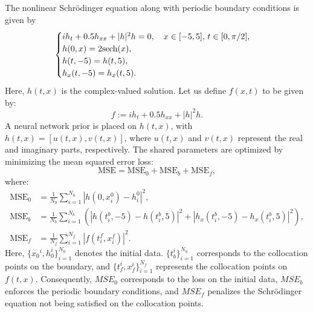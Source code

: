 \begin{example}
    The nonlinear Schrödinger equation along with periodic boundary conditions is given by
\begin{equation}\label{eq:PINN-NLS}
    \begin{cases}
        i h_t + 0.5 h_{xx} + |h|^2 h = 0, \quad x \in [-5, 5], \, t \in [0, \pi/2], \\
        h(0, x) = 2 \text{sech}{(x)}, \\
        h(t, -5) = h(t, 5), \\
        h_x(t, -5) = h_x(t, 5).
    \end{cases}
\end{equation}
Here, $ h(t, x) $ is the complex-valued solution. Let us define $ f(x,t) $ to be given by:
\begin{equation}
    f := i h_t + 0.5 h_{xx} + |h|^2 h.
\end{equation}
A neural network prior is placed on \( h(t, x) \), with \( h(t, x) = [u(t, x), v(t, x)] \), where \( u(t, x) \) and \( v(t, x) \) represent the real and imaginary parts, respectively. The shared parameters are optimized by minimizing the mean squared error loss:
\begin{equation}\label{eq:PINN-NLS-Loss}
    \text{MSE} = \text{MSE}_0 + \text{MSE}_b + \text{MSE}_f,
\end{equation}
where:
\begin{equation*}
    \begin{aligned}
        \text{MSE}_0 &= \frac{1}{N_0} \sum_{i=1}^{N_0} |h(0, x_i^0) - h_i^0|^2, \\
        \text{MSE}_b &= \frac{1}{N_b} \sum_{i=1}^{N_b} \left( |h(t_i^b, -5) - h(t_i^b, 5)|^2 + |h_x(t_i^b, -5) - h_x(t_i^b, 5)|^2 \right), \\
        \text{MSE}_f &= \frac{1}{N_f} \sum_{i=1}^{N_f} |f(t_i^f, x_i^f)|^2.
    \end{aligned}
\end{equation*}
Here, $ \{x_{0}{^i}, h_{0}^{i}\}_{i=1}^{N_{0}} $ denotes the initial data. $ \{t_{b}^{i}\}_{i=1}^{N_{b}} $ corresponds to the collocation points on the boundary, and $ \{t_{f}^{i}, x_{f}^{i}\}_{i=1}^{N_{f}} $ represents the collocation points on $ f(t, x) $. Consequently, $ MSE_{0} $ corresponds to the loss on the initial data, $ MSE_{b} $ enforces the periodic boundary conditions, and $ MSE_{f} $ penalizes the Schrödinger equation not being satisfied on the collocation points. 
\end{example}

